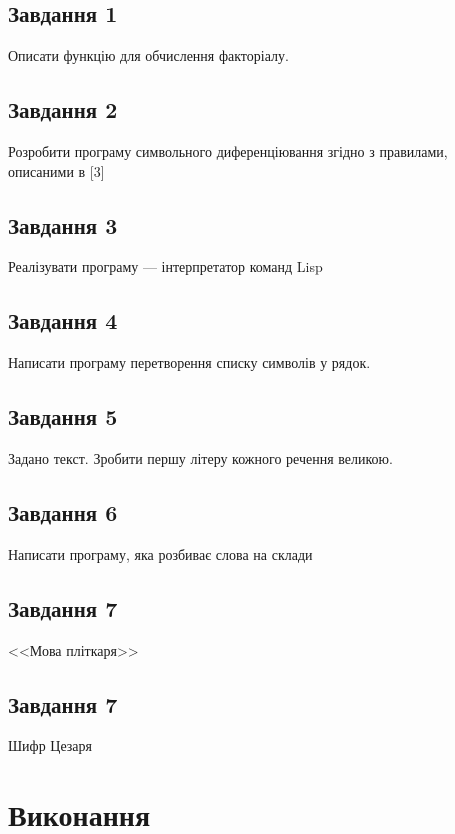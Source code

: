 \documentclass[a4paper, 12pt]{extarticle}
\begin{document}
\subsection{Завдання 1}
Описати функцію для обчислення факторіалу.

\subsection{Завдання 2}
Розробити програму символьного диференціювання згідно з правилами, описаними в [3]

\subsection{Завдання 3}
Реалізувати програму --- інтерпретатор команд Lisp

\subsection{Завдання 4}
Написати програму перетворення списку символів у рядок.

\subsection{Завдання 5}
Задано текст. Зробити першу літеру кожного речення великою.

\subsection{Завдання 6}
Написати програму, яка розбиває слова на склади

\subsection{Завдання 7}
<<Мова пліткаря>>

\subsection{Завдання 7}
Шифр Цезаря

\section{Виконання}








\end{document}
